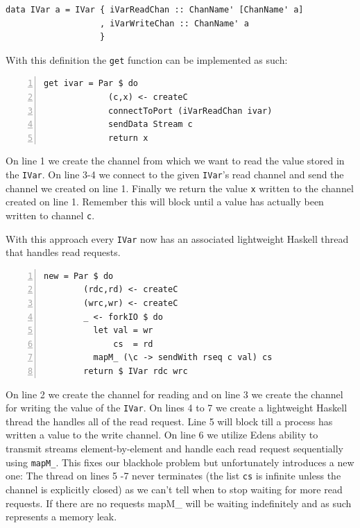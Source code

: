 \documentclass[a4paper, oneside, final]{memoir}
\begin{document}
\begin{lstlisting}
data IVar a = IVar { iVarReadChan :: ChanName' [ChanName' a]
                   , iVarWriteChan :: ChanName' a
                   }
\end{lstlisting}

With this definition the \texttt{get} function can be implemented as 
such: \newline

\begin{lstlisting}[numbers=left, numberstyle=\tiny]
get ivar = Par $ do
             (c,x) <- createC
             connectToPort (iVarReadChan ivar)
             sendData Stream c
             return x
\end{lstlisting}

On line 1 we create the channel from which we want to read the value
stored in the \texttt{IVar}. On line 3-4 we connect to the given
\texttt{IVar}'s read channel and send the channel we created on line 1. 
Finally we return the value \texttt{x} written to the channel created on line 1. Remember this will block until a value has actually been written to 
channel \texttt{c}.

With this approach every \texttt{IVar} now has an associated lightweight
Haskell thread that handles read requests. \newline

\begin{lstlisting}[numbers=left, numberstyle=\tiny]
new = Par $ do
        (rdc,rd) <- createC
        (wrc,wr) <- createC
        _ <- forkIO $ do
          let val = wr
              cs  = rd
          mapM_ (\c -> sendWith rseq c val) cs
        return $ IVar rdc wrc
\end{lstlisting}

On line 2 we create the channel for reading and on line 3 we create
the channel for writing the value of the \texttt{IVar}. On lines 4 to
7 we create a lightweight Haskell thread the handles all of the read
request. Line 5 will block till a process has written a value to the
write channel. On line 6 we utilize Edens ability to transmit streams
element-by-element and handle each read request sequentially using
\texttt{mapM\_}. This fixes our blackhole problem but unfortunately
introduces a new one: The thread on lines 5 -7 never terminates (the
list \texttt{cs} is infinite unless the channel is explicitly closed)
as we can't tell when to stop waiting for more read requests. If there
are no requests mapM\_ will be waiting indefinitely and as such
represents a memory leak.
\end{document}
